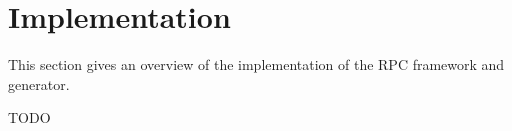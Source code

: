 \chapter{Implementation}
\label{Chapter5}

This section gives an overview of the implementation of the RPC framework and generator.

TODO


\pagebreak


\pagebreak


\pagebreak


\pagebreak


\pagebreak



\pagebreak


